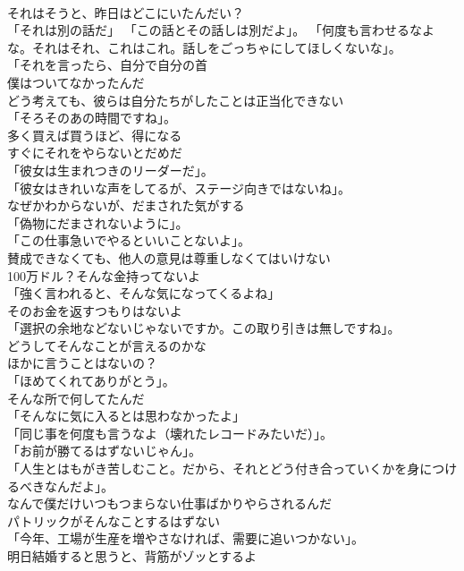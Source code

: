 \documentclass[8pt]{extreport}
\begin{document}
\begin{CJK}{UTF8}{min}
\\	それはそうと、昨日はどこにいたんだい？	
\\	「それは別の話だ」 「この話とその話しは別だよ」。 「何度も言わせるなよな。それはそれ、これはこれ。話しをごっちゃにしてほしくないな」。	
\\	「それを言ったら、自分で自分の首	
\\	僕はついてなかったんだ	
\\	どう考えても、彼らは自分たちがしたことは正当化できない	
\\	「そろそのあの時間ですね」。	
\\	多く買えば買うほど、得になる	
\\	すぐにそれをやらないとだめだ	
\\	「彼女は生まれつきのリーダーだ」。	
\\	「彼女はきれいな声をしてるが、ステージ向きではないね」。	
\\	なぜかわからないが、だまされた気がする	
\\	「偽物にだまされないように」。	
\\	「この仕事急いでやるといいことないよ」。	
\\	賛成できなくても、他人の意見は尊重しなくてはいけない	
\\	100万ドル？そんな金持ってないよ	
\\	「強く言われると、そんな気になってくるよね」	
\\	そのお金を返すつもりはないよ	
\\	「選択の余地などないじゃないですか。この取り引きは無しですね」。	
\\	どうしてそんなことが言えるのかな	
\\	ほかに言うことはないの？	
\\	「ほめてくれてありがとう」。	
\\	そんな所で何してたんだ	
\\	「そんなに気に入るとは思わなかったよ」	
\\	「同じ事を何度も言うなよ（壊れたレコードみたいだ）」。	
\\	「お前が勝てるはずないじゃん」。	
\\	「人生とはもがき苦しむこと。だから、それとどう付き合っていくかを身につけるべきなんだよ」。	
\\	なんで僕だけいつもつまらない仕事ばかりやらされるんだ	
\\	パトリックがそんなことするはずない	
\\	「今年、工場が生産を増やさなければ、需要に追いつかない」。	
\\	明日結婚すると思うと、背筋がゾッとするよ	

\end{CJK}
\end{document}
